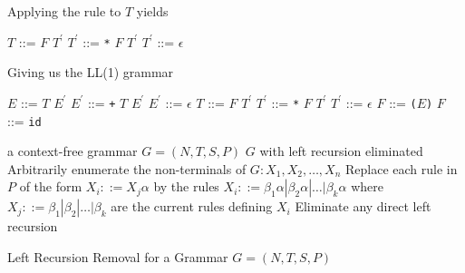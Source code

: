 \documentclass[8pt,a4paper,compress]{beamer}
\newcommand{\mm}[1]{$#1$}
\newcommand{\expo}[2]{$#1^{#2}$}
\newenvironment{spaced}
{
\smallskip
\hspace{.5cm}
\begin{minipage}[c]{\textwidth}
}
{
\end{minipage}
\smallskip
}
\begin{document}
\begin{frame}[fragile]
\pause

Applying the rule to $T$ yields

\text{ }
\begin{spaced}
\begin{production}
\mm{T}  ::= \mm{F} \expo{T}{\prime}
\expo{T}{\prime} ::= \lstinline{*} \mm{F} \expo{T}{\prime}
\expo{T}{\prime} ::= \mm{\epsilon}
\end{production}
\end{spaced}

\pause

Giving us the LL(1) grammar

\text{ }
\begin{spaced}
\begin{production}
\mm{E}  ::= \mm{T} \expo{E}{\prime}
\expo{E}{\prime} ::= \lstinline{+} \mm{T} \expo{E}{\prime}
\expo{E}{\prime} ::= \mm{\epsilon}
\mm{T}  ::= \mm{F} \expo{T}{\prime}
\expo{T}{\prime} ::= \lstinline{*} \mm{F} \expo{T}{\prime}
\expo{T}{\prime} ::= \mm{\epsilon}
\mm{F}  ::= \lstinline{(}\mm{E}\lstinline{)}
\mm{F}  ::= \lstinline{id}
\end{production}
\end{spaced}
\end{frame}

\begin{frame}[fragile]
\pause

\begin{algorithm}[H]
\begin{algorithmic}
\REQUIRE a context-free grammar $G=(N,T,S,P)$
\ENSURE $G$ with left recursion eliminated
\STATE Arbitrarily enumerate the non-terminals of $G: X_1, X_2, \dots, X_n$
\STATE Replace each rule in $P$ of the form $X_i::= X_j\alpha$ by the rules $X_i ::= \beta_1\alpha | \beta_2\alpha | \dots | \beta_k\alpha$ where $X_j ::= \beta_1 | \beta_2 | \dots | \beta_k$ are the current rules defining $X_i$
\STATE Eliminate any direct left recursion
\ENDFOR
\ENDFOR
\end{algorithmic}
\caption{Left Recursion Removal for a Grammar $G=(N,T,S,P)$}
\end{algorithm}
\end{frame}
\end{document}
